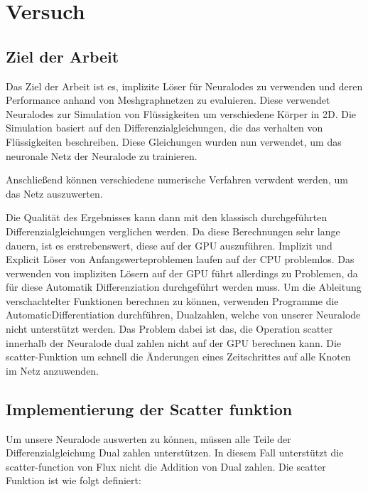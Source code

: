 
\chapter{Versuch}

\section{Ziel der Arbeit}

Das Ziel der Arbeit ist es, implizite Löser für Neuralodes zu verwenden 
und deren Performance anhand von Meshgraphnetzen zu evaluieren. 
Diese verwendet Neuralodes zur Simulation von Flüssigkeiten um verschiedene Körper in 2D.
Die Simulation basiert auf den Differenzialgleichungen, die das verhalten von Flüssigkeiten beschreiben.
Diese Gleichungen wurden nun verwendet, um das neuronale Netz der Neuralode zu trainieren.

Anschließend können verschiedene numerische Verfahren verwdent werden, um das Netz auszuwerten.

Die Qualität des Ergebnisses kann dann mit den klassisch durchgeführten Differenzialgleichungen verglichen werden.
Da diese Berechnungen sehr lange dauern, ist es erstrebenswert, diese auf der GPU auszuführen.
Implizit und Explicit Löser von Anfangswerteproblemen laufen auf der CPU problemlos.
Das verwenden von impliziten Lösern auf der GPU führt allerdings zu Problemen, da für diese Automatik Differenziation durchgeführt werden muss.
Um die Ableitung verschachtelter Funktionen berechnen zu können, verwenden
Programme die AutomaticDifferentiation durchführen, Dualzahlen, welche von unserer Neuralode nicht unterstützt werden.
Das Problem dabei ist das, die Operation scatter innerhalb der Neuralode dual zahlen nicht auf der GPU 
berechnen kann.
Die scatter-Funktion um schnell die Änderungen eines Zeitschrittes auf alle Knoten im Netz anzuwenden.



\section{Implementierung der Scatter funktion}

Um unsere Neuralode auswerten zu können, müssen alle Teile der Differenzialgleichung Dual zahlen unterstützen.
In diesem Fall unterstützt die scatter-function von Flux nicht die Addition von Dual zahlen.
Die scatter Funktion ist wie folgt definiert:

